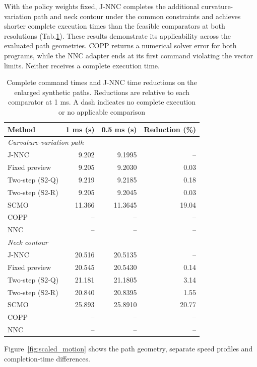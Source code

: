 \documentclass[pdflatex,sn-apa]{sn-jnl}
\begin{document}
With the policy weights fixed, J-NNC completes the additional curvature-variation path and neck contour under the common constraints and achieves shorter complete execution times than the feasible comparators at both resolutions (Tab.\nobreakspace\ref{tab:representative_comparison}). These results demonstrate its applicability across the evaluated path geometries. COPP returns a numerical solver error for both programs, while the NNC adapter ends at its first command violating the vector limits. Neither receives a complete execution time.

\begin{table}[htbp]
\centering\small
\caption{Complete command times and J-NNC time reductions on the enlarged synthetic paths. Reductions are relative to each comparator at 1 ms. A dash indicates no complete execution or no applicable comparison}
\label{tab:representative_comparison}
\begin{tabular}{lrrr}
\toprule
Method & 1 ms (s) & 0.5 ms (s) & Reduction (\%) \\
\midrule
\multicolumn{4}{l}{\textit{Curvature-variation path}} \\
\addlinespace[2pt]
J-NNC & 9.202 & 9.1995 & -- \\
Fixed preview & 9.205 & 9.2030 & 0.03 \\
Two-step (S2-Q) & 9.219 & 9.2185 & 0.18 \\
Two-step (S2-R) & 9.205 & 9.2045 & 0.03 \\
SCMO & 11.366 & 11.3645 & 19.04 \\
COPP & -- & -- & -- \\
NNC & -- & -- & -- \\
\midrule
\multicolumn{4}{l}{\textit{Neck contour}} \\
\addlinespace[2pt]
J-NNC & 20.516 & 20.5135 & -- \\
Fixed preview & 20.545 & 20.5430 & 0.14 \\
Two-step (S2-Q) & 21.181 & 21.1805 & 3.14 \\
Two-step (S2-R) & 20.840 & 20.8395 & 1.55 \\
SCMO & 25.893 & 25.8910 & 20.77 \\
COPP & -- & -- & -- \\
NNC & -- & -- & -- \\
\bottomrule
\end{tabular}
\end{table}

Figure~\ref{fig:scaled_motion} shows the path geometry, separate speed profiles and completion-time differences.
\end{document}
